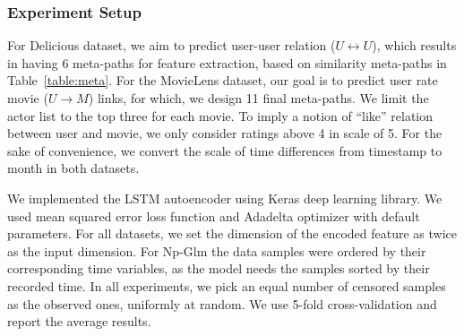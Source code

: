 
\subsubsection{Experiment Setup}
For Delicious dataset, we aim to predict user-user relation ($U\leftrightarrow U$), which results in having 6 meta-paths for feature extraction, based on similarity meta-paths in Table~\ref{table:meta}.
For the MovieLens dataset, our goal is to predict user rate movie ($U\rightarrow M$) links, for which, we design 11 final meta-paths. We limit the actor list to the top three for each movie. To imply a notion of ``like'' relation between user and movie, we only consider ratings above 4 in scale of 5. For the sake of convenience, we convert the scale of time differences from timestamp to month in both datasets.

We implemented the LSTM autoencoder using Keras deep learning library. We used mean squared error loss function and Adadelta optimizer with default parameters. For all datasets, we set the dimension of the encoded feature as twice as the input dimension. For Np-Glm the data samples were ordered by their corresponding time variables, as the model needs the samples sorted by their recorded time. In all experiments, we pick an equal number of censored samples as the observed ones, uniformly at random. We use 5-fold cross-validation and report the average results.

